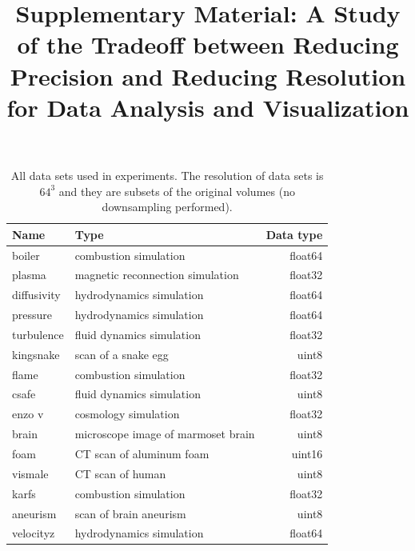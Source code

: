 \documentclass{article}
\title{Supplementary Material: A Study of the Tradeoff between Reducing Precision and Reducing Resolution for Data Analysis and Visualization}
\date{}
\begin{document}
\maketitle


\begin{table}[ht]
        \caption{All data sets used in experiments. The resolution of data sets is $64^3$ and
        they are subsets of the original volumes (no downsampling performed).}
  \centering
  \begin{tabular}{llr}
  \toprule
  Name & Type & Data type \\
  \midrule
  boiler & combustion simulation& float64\\
  plasma & magnetic reconnection simulation& float32\\
  diffusivity & hydrodynamics simulation& float64\\
  pressure & hydrodynamics simulation& float64\\
  turbulence & fluid dynamics simulation& float32\\
  kingsnake & scan of a snake egg & uint8\\
  flame & combustion simulation& float32\\
  csafe & fluid dynamics simulation& uint8\\
  enzo v & cosmology simulation& float32\\
  brain & microscope image of marmoset brain & uint8\\
  foam & CT scan of aluminum foam & uint16\\
  vismale & CT scan of human & uint8 \\
  karfs & combustion simulation& float32\\
  aneurism      & scan of brain aneurism & uint8 \\
  velocityz & hydrodynamics simulation& float64 \\
  \bottomrule
  \end{tabular}\label{tbl:data-sets}
\end{table}
\end{document}
